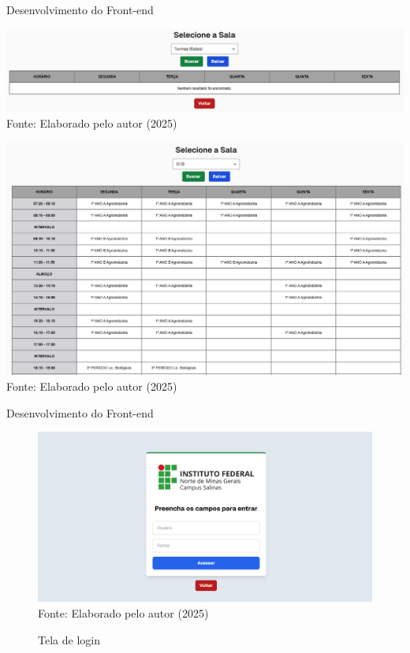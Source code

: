 \begin{frame}{Desenvolvimento do Front-end}
    \begin{minipage}{0.48\textwidth}
        \centering
        \includegraphics[width=1\textwidth]{figuras/front-7.png}
        \small Fonte: Elaborado pelo autor (2025)
    \end{minipage}
    \hfill
    \begin{minipage}{0.48\textwidth}
        \centering
        \includegraphics[width=1\textwidth]{figuras/front-8.png}
        \small Fonte: Elaborado pelo autor (2025)
    \end{minipage}
\end{frame}

\begin{frame}{Desenvolvimento do Front-end}
    \begin{figure}
        \centering
        \vspace{-0.5cm}
        \caption{Tela de login}
        \vspace{-0.2cm}
        \includegraphics[width=1\textwidth]{figuras/front-9.png}
        \\ %
        \small Fonte: Elaborado pelo autor (2025)
    \end{figure}
\end{frame}

